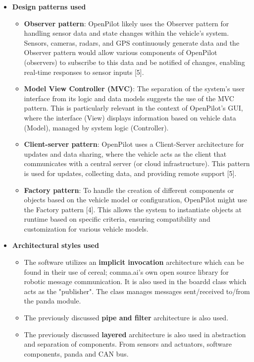 \documentclass[12pt]{article}
\begin{document}
\begin{itemize}

    \item \textbf{Design patterns used}
    \begin{itemize}
         \item[] \textbf{Observer pattern}: OpenPilot likely uses the Observer pattern for handling sensor data and state changes within the vehicle's system. Sensors, cameras, radars, and GPS continuously generate data and the Observer pattern would allow various components of OpenPilot (observers) to subscribe to this data and be notified of changes, enabling real-time responses to sensor inputs [5].

    \item[] \textbf{Model View Controller (MVC)}: The separation of the system's user interface from its logic and data models suggests the use of the MVC pattern. This is particularly relevant in the context of OpenPilot's GUI, where the interface (View) displays information based on vehicle data (Model), managed by system logic (Controller).

    \item[] \textbf{Client-server pattern}: OpenPilot uses a Client-Server architecture for updates and data sharing, where the vehicle acts as the client that communicates with a central server (or cloud infrastructure). This pattern is used for  updates, collecting data, and providing remote support [5].

    

    \item[] \textbf{Factory pattern}: To handle the creation of different components or objects based on the vehicle model or configuration, OpenPilot might use the Factory pattern [4]. This allows the system to instantiate objects at runtime based on specific criteria, ensuring compatibility and customization for various vehicle models.
    \end{itemize}

    \item \textbf{Architectural styles used}
    \begin{itemize}
        \item The software utilizes an \textbf{implicit invocation} architecture which can be found in their use of cereal; comma.ai's own open source library for robotic message communication. It is also used in the boardd class which acts as the "publisher". The class manages messages sent/received to/from the panda module.
        \item The previously discussed \textbf{pipe and filter} architecture is also used.
        \item The previously discussed \textbf{layered} architecture is also used in abstraction and separation of components. From sensors and actuators, software components, panda and CAN bus.
        
    \end{itemize}
\end{itemize}
\end{document}
